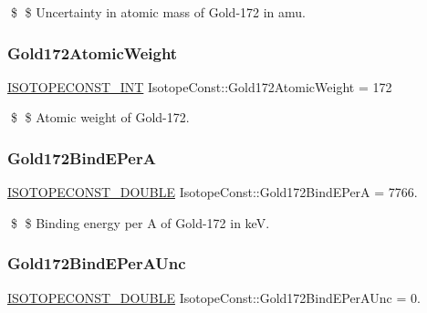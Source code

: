 \$ \$ Uncertainty in atomic mass of Gold-\/172 in amu. \mbox{\label{group___isotope_const-_gold-_au172_ga6e90d0dc6eae666bac9712c22f3c37f4}} 
\subsubsection{\texorpdfstring{Gold172\+Atomic\+Weight}{Gold172AtomicWeight}}
{\footnotesize\ttfamily \mbox{\hyperlink{group___isotope_const-_macros_ga5f18360b3e99483a35c32d789e62621c}{I\+S\+O\+T\+O\+P\+E\+C\+O\+N\+S\+T\+\_\+\+I\+NT}} Isotope\+Const\+::\+Gold172\+Atomic\+Weight = 172}

\$ \$ Atomic weight of Gold-\/172. \mbox{\label{group___isotope_const-_gold-_au172_ga27fc8e64fc3451f123d9d63055cbd76e}} 
\subsubsection{\texorpdfstring{Gold172\+Bind\+E\+PerA}{Gold172BindEPerA}}
{\footnotesize\ttfamily \mbox{\hyperlink{group___isotope_const-_macros_ga8f45a7272ce02c0b4c65c44636ed719a}{I\+S\+O\+T\+O\+P\+E\+C\+O\+N\+S\+T\+\_\+\+D\+O\+U\+B\+LE}} Isotope\+Const\+::\+Gold172\+Bind\+E\+PerA = 7766.}

\$ \$ Binding energy per A of Gold-\/172 in keV. \mbox{\label{group___isotope_const-_gold-_au172_ga9149dedc350f8acb57634f8dced96157}} 
\subsubsection{\texorpdfstring{Gold172\+Bind\+E\+Per\+A\+Unc}{Gold172BindEPerAUnc}}
{\footnotesize\ttfamily \mbox{\hyperlink{group___isotope_const-_macros_ga8f45a7272ce02c0b4c65c44636ed719a}{I\+S\+O\+T\+O\+P\+E\+C\+O\+N\+S\+T\+\_\+\+D\+O\+U\+B\+LE}} Isotope\+Const\+::\+Gold172\+Bind\+E\+Per\+A\+Unc = 0.}

